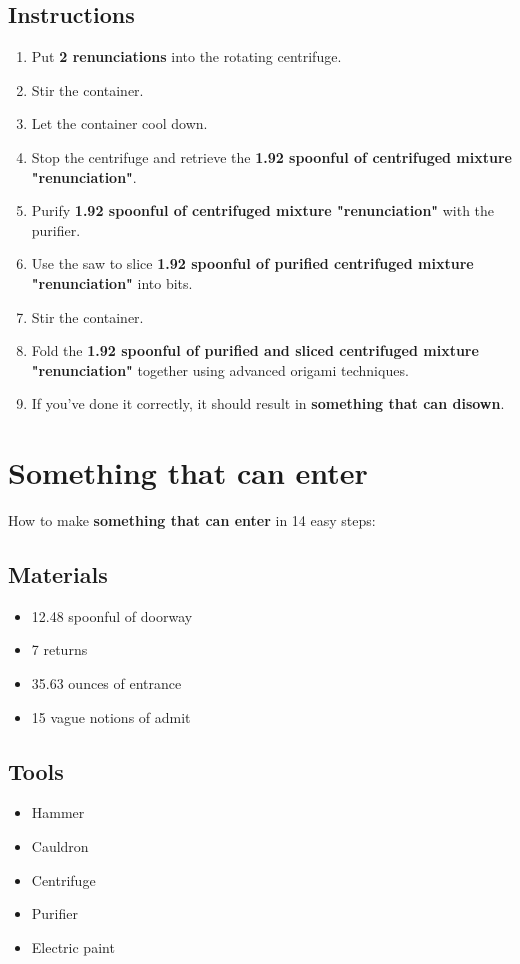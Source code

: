 \documentclass{article}
\begin{document}
\subsection{Instructions}\begin{enumerate}
\item 
Put \textbf{2 renunciations} into the rotating centrifuge.
\item 
Stir the container.
\item 
Let the container cool down.
\item 
Stop the centrifuge and retrieve the \textbf{1.92 spoonful of centrifuged mixture "renunciation"}.
\item 
Purify \textbf{1.92 spoonful of centrifuged mixture "renunciation"} with the purifier.
\item 
Use the saw to slice \textbf{1.92 spoonful of purified centrifuged mixture "renunciation"} into bits.
\item 
Stir the container.
\item 
Fold the \textbf{1.92 spoonful of purified and sliced centrifuged mixture "renunciation"} together using advanced origami techniques.
\item 
If you've done it correctly, it should result in \textbf{something that can disown}.
\end{enumerate}
\newpage
\section{Something that can enter}How to make \textbf{something that can enter} in 14 easy steps:

\subsection{Materials}\begin{itemize}
\item 
12.48 spoonful of doorway
\item 
7 returns
\item 
35.63 ounces of entrance
\item 
15 vague notions of admit
\end{itemize}
\subsection{Tools}\begin{itemize}
\item 
Hammer
\item 
Cauldron
\item 
Centrifuge
\item 
Purifier
\item 
Electric paint
\end{itemize}
\end{document}

